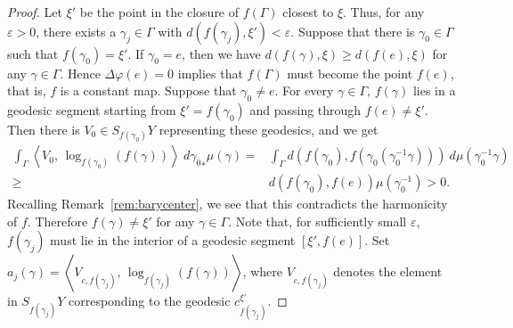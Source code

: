 \documentclass[12pt]{amsart}
\numberwithin{equation}{section}
\theoremstyle{plain}
\theoremstyle{definition}
\theoremstyle{remark}
\newcommand{\tcprj}{\log}
\newcommand{\inner}[2]{\left\langle #1,\, #2 \right\rangle}
\newcommand{\cc}[2]{c_{#1}^{#2}}
\begin{document}
\begin{proof}
Let $\xi'$ be the point in the closure of $f(\Gamma)$ closest to $\xi$.
Thus, for any $\varepsilon >0$, there exists a $\gamma_j \in \Gamma$
with $d(f(\gamma_j), \xi')< \varepsilon$. 
Suppose that there is $\gamma_0 \in \Gamma$ such
that  $f(\gamma_0)=\xi'$. 
If $\gamma_0=e$, then we have $d(f(\gamma),\xi)\geq d(f(e),\xi)$ for
 any $\gamma \in \Gamma$.
Hence $\Delta \varphi(e)=0$ implies that
$f(\Gamma)$ must become the point $f(e)$, that is, $f$ is a constant
 map. 
Suppose that $\gamma_0\not= e$. 
For every $\gamma \in \Gamma$,
$f(\gamma)$ lies in a geodesic segment starting from
$\xi'=f(\gamma_0)$ and passing through $f(e)\not= \xi'$. 
Then there is $V_0 \in S_{f(\gamma_0)}Y$ representing these geodesics,
and we get
\begin{equation*}
\begin{split}
   \int_{\Gamma} \inner{V_0}{\tcprj_{f(\gamma_0)} (f(\gamma))}
  \ d{\gamma_0}_*\mu(\gamma)
  = & \int_{\Gamma} d(f(\gamma_0), f(\gamma_0(\gamma_0^{-1}\gamma))) \ 
    d\mu(\gamma_0^{-1}\gamma) \\
  \geq & d(f(\gamma_0),f(e)) \mu(\gamma_0^{-1}) >0. 
\end{split}
\end{equation*}
Recalling Remark~\ref{rem:barycenter}, we see that this
contradicts the harmonicity of $f$.
Therefore $f(\gamma)\not=\xi'$ for any $\gamma \in \Gamma$. 
Note that, for sufficiently small $\varepsilon$, $f(\gamma_j)$ must lie
in the interior of a geodesic segment $[\xi', f(e)]$. 
Set 
$a_j(\gamma)=\inner{V_{c,f(\gamma_j)}}{\tcprj_{f(\gamma_j)}(f(\gamma))}$, 
where $V_{c,f(\gamma_j)}$ denotes the element in $S_{f(\gamma_j)}Y$
corresponding to the geodesic $\cc{f(\gamma_j)}{\xi'}$.


\end{proof}
\end{document}
